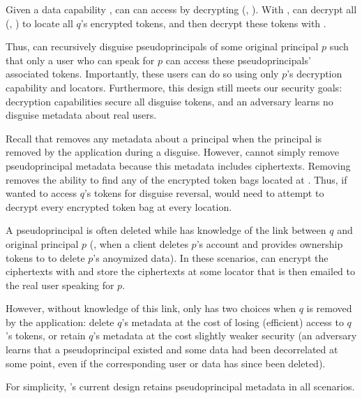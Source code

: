 Given a data capability , \sys can can access  by decrypting \enc(,
).
%
With , \sys can decrypt all \enc(, ) to locate all $q$'s encrypted
tokens, and then decrypt these tokens with . 

Thus, \sys can recursively disguise pseudoprincipals of some original principal $p$ such that only a
user who can speak for $p$ can access these pseudoprincipals' associated tokens.
Importantly, these users can do so using only $p$'s decryption capability and locators.
Furthermore, this design still meets our security goals: decryption capabilities secure all disguise
tokens, and an adversary learns no disguise metadata about real users.


Recall that \sys removes any metadata about a principal when the principal is removed by the
application during a disguise.
However, \sys cannot simply remove pseudoprincipal metadata because this metadata includes 
ciphertexts. Removing  removes the ability to find any of the encrypted token bags
located at . Thus, if \sys wanted to access $q$'s tokens for \eg disguise reversal, \sys
would need to attempt to decrypt every encrypted token bag at every location.

A pseudoprincipal is often deleted while \sys has knowledge of the link between $q$ and
original principal $p$ (\eg, when a client deletes $p$'s account and provides ownership tokens
to \sys to delete $p$'s anoymized data). In these scenarios, \sys can encrypt the
 ciphertexts with  and store the ciphertexts at some locator that is then emailed
to the real user speaking for $p$.

However, without knowledge of this link, \sys only has two choices when $q$ is removed by the
application: delete $q$'s metadata at the cost of losing (efficient) access to $q$'s tokens, or
retain $q$'s metadata at the cost slightly weaker security (an adversary learns that a
pseudoprincipal existed and some data had been decorrelated at some point, even if the corresponding
user or data has since been deleted).

For simplicity, \sys's current design retains pseudoprincipal metadata in all scenarios.

\iffalse
Two strawmen, simple designs either fail to achieve this security property, or reduce functionality:
\begin{enumerate}
    \item \emph{Weak Security:} \sys can store \privk{q} in plaintext for pseudoprincipal $q$. 
        This is equivalent to $q$'s data being undisguised after compromise.  
    \item \emph{Permanent Disguises:} \sys throws away \privk{q} for pseudoprincipal $q$. This means that the
            disguise modifications to pseudoprincipal data are permanent, and prevents temporary
            recorrelation and disguise revealing.
\end{enumerate}

\fi
